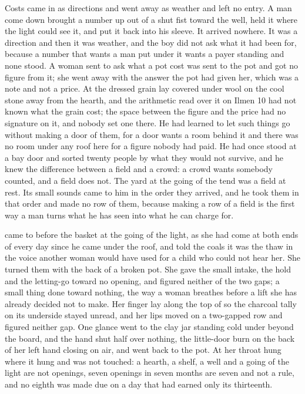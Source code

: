 Costs came in as directions and went away as weather and left no entry. A man come down  brought a number up out of a shut fist toward the well, held it where the light could see it, and put it back into his sleeve. It arrived nowhere. It was a direction and then it was weather, and the boy did not ask what it had been for, because a number that wants a man put under it wants a payer standing and none stood. A woman sent to ask what a pot cost was sent to the pot and got no figure from it; she went away with the answer the pot had given her, which was a note and not a price. At  the dressed grain lay covered under wool on the cool stone away from the hearth, and the arithmetic read over it on Ilmen 10 had not known what the grain cost; the space between the figure and the price had no signature on it, and nobody set one there. He had learned to let such things go without making a door of them, for a door wants a room behind it and there was no room under any roof here for a figure nobody had paid. He had once stood at a bay door and sorted twenty people by what they would not survive, and he knew the difference between a field and a crowd: a crowd wants somebody counted, and a field does not. The yard at the going of the tend was a field at rest. Its small sounds came to him in the order they arrived, and he took them in that order and made no row of them, because making a row of a field is the first way a man turns what he has seen into what he can charge for.

 came to  before the basket at the going of the light, as she had come at both ends of every day since he came under the roof, and told the coals it was the thaw in the voice another woman would have used for a child who could not hear her. She turned them with the back of a broken pot. She gave the small intake, the hold and the letting-go toward no opening, and figured neither of the two gaps; a small thing done toward nothing, the way a woman breathes before a lift she has already decided not to make. Her finger lay along the top of  so the charcoal tally on its underside stayed unread, and her lips moved on a two-gapped row and figured neither gap. One glance went to the clay jar standing cold under  beyond the board, and the hand shut half over nothing, the little-door burn on the back of her left hand closing on air, and went back to the pot. At her throat  hung where it hung and was not touched: a hearth, a shelf, a well and a going of the light are not openings, seven openings in seven months are seven and not a rule, and no eighth was made due on a day that had earned only its thirteenth.

